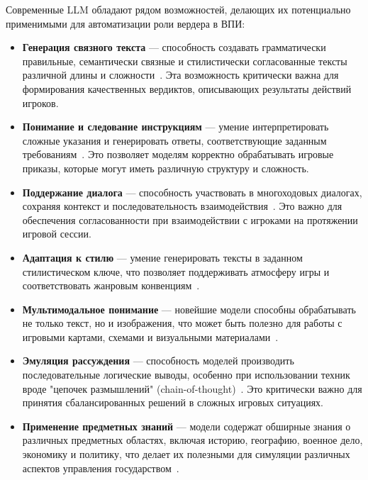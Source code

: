 Современные LLM обладают рядом возможностей, делающих их потенциально применимыми для автоматизации роли вердера в ВПИ:

\begin{itemize}
    \item \textbf{Генерация связного текста} — способность создавать грамматически правильные, семантически связные и стилистически согласованные тексты различной длины и сложности~\cite{brown2020language}. Эта возможность критически важна для формирования качественных вердиктов, описывающих результаты действий игроков.

    \item \textbf{Понимание и следование инструкциям} — умение интерпретировать сложные указания и генерировать ответы, соответствующие заданным требованиям~\cite{wei2022finetuned}. Это позволяет моделям корректно обрабатывать игровые приказы, которые могут иметь различную структуру и сложность.

    \item \textbf{Поддержание диалога} — способность участвовать в многоходовых диалогах, сохраняя контекст и последовательность взаимодействия~\cite{thoppilan2022lamda}. Это важно для обеспечения согласованности при взаимодействии с игроками на протяжении игровой сессии.

    \item \textbf{Адаптация к стилю} — умение генерировать тексты в заданном стилистическом ключе, что позволяет поддерживать атмосферу игры и соответствовать жанровым конвенциям~\cite{keskar2019ctrl}.

    \item \textbf{Мультимодальное понимание} — новейшие модели способны обрабатывать не только текст, но и изображения, что может быть полезно для работы с игровыми картами, схемами и визуальными материалами~\cite{alayrac2022flamingo}.

    \item \textbf{Эмуляция рассуждения} — способность моделей производить последовательные логические выводы, особенно при использовании техник вроде "цепочек размышлений" (chain-of-thought)~\cite{wei2022chain}. Это критически важно для принятия сбалансированных решений в сложных игровых ситуациях.

    \item \textbf{Применение предметных знаний} — модели содержат обширные знания о различных предметных областях, включая историю, географию, военное дело, экономику и политику, что делает их полезными для симуляции различных аспектов управления государством~\cite{brown2020language}.
\end{itemize}

